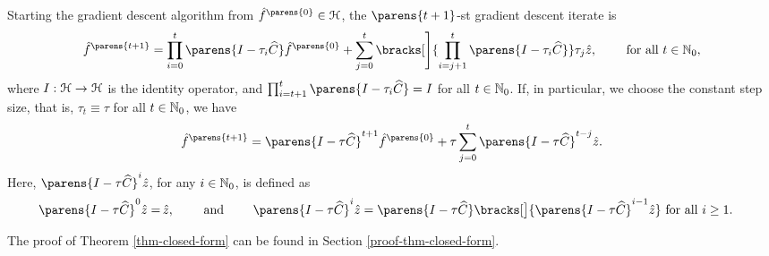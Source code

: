 \begin{theorem}\label{thm-closed-form}
	Starting the gradient descent algorithm from $\hat{f}^{\parens{0}} \in \calH$, the $\parens{t+1}$-st gradient descent iterate is 
	\begin{align}\label{eq-closed-form}
		\hat{f}^{\parens{t+1}} = \prod_{i=0}^{t} \parens{I - \tau_i \widehat{C}} \hat{f}^{\parens{0}} + \sum_{j=0}^{t} \bracks[\Bigg]{\prod_{i=j+1}^{t} \parens{I - \tau_i \widehat{C}}} \tau_j \hat{z}, \qquad \text{ for all } t \in \Natural_0, 
	\end{align}
	where $I: \mathcal{H} \to \mathcal{H}$ is the identity operator, and $\prod_{i=t+1}^{t} \parens{I - \tau_i \widehat{C}} = I$ for all $t \in \mathbb{N}_0$. If, in particular, we choose the constant step size, that is, $\tau_t \equiv \tau$ for all $t \in \mathbb{N}_0$, we have
	\begin{align*}
		\hat{f}^{\parens{t+1}} = \parens{I - \tau \widehat{C}}^{t+1} \hat{f}^{\parens{0}} + \tau \sum_{j=0}^{t} \parens{I - \tau \widehat{C}}^{t-j} \hat{z}. 
	\end{align*}
	Here, $\parens{I - \tau \widehat{C}}^{i} \hat{z}$, for any $i \in \mathbb{N}_0$, is defined as 
	\begin{align*}
		\parens{I - \tau \widehat{C}}^{0} \hat{z} = & \, \hat{z}, \qquad \text{ and } \qquad
		\parens{I - \tau \widehat{C}}^{i} \hat{z} = \parens{I - \tau \widehat{C}} \bracks[\big]{\parens{I - \tau \widehat{C}}^{i-1} \hat{z}} \text{ for all } i \ge 1. 
	\end{align*}
\end{theorem}

The proof of Theorem \ref{thm-closed-form} can be found in Section \ref{proof-thm-closed-form}. 

